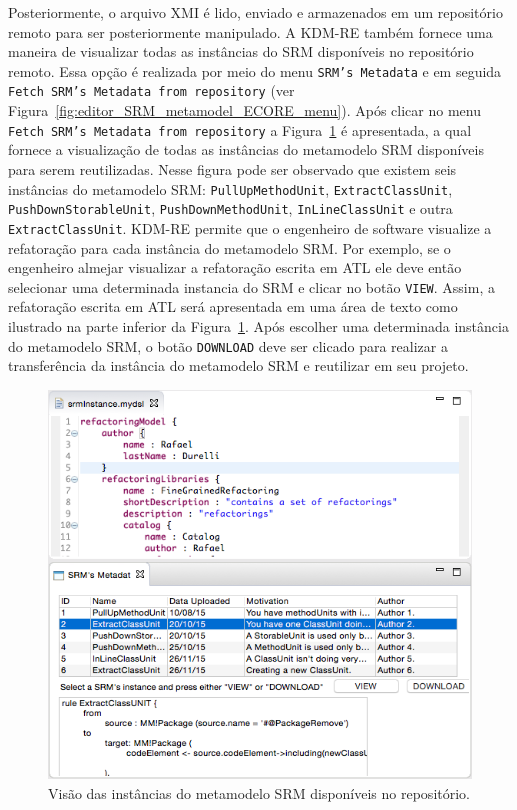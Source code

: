  Posteriormente, o arquivo XMI é lido, enviado e armazenados em um repositório remoto para ser posteriormente manipulado. A KDM-RE também fornece uma maneira de visualizar todas as instâncias do SRM disponíveis no repositório remoto. Essa opção é realizada por meio do menu \texttt{SRM's Metadata} e em seguida \texttt{Fetch SRM's Metadata from repository} (ver Figura~\ref{fig:editor_SRM_metamodel_ECORE_menu}). Após clicar no menu \texttt{Fetch SRM's Metadata from repository} a Figura~\ref{fig:download_kDM_re_repository} é apresentada, a qual fornece a visualização de todas as instâncias do metamodelo SRM disponíveis para serem reutilizadas. Nesse figura pode ser observado que existem seis instâncias do metamodelo SRM: \texttt{PullUpMethodUnit}, \texttt{ExtractClassUnit}, \texttt{PushDownStorableUnit}, \texttt{PushDownMethodUnit}, \texttt{InLineClassUnit} e outra \texttt{ExtractClassUnit}. KDM-RE permite que o engenheiro de software visualize a refatoração para cada instância do metamodelo SRM. Por exemplo, se o engenheiro almejar visualizar a refatoração escrita em ATL ele deve então selecionar uma determinada instancia do SRM e clicar no botão \texttt{VIEW}. Assim, a refatoração escrita em ATL será apresentada em uma área de texto como ilustrado na parte inferior da Figura~\ref{fig:download_kDM_re_repository}. Após escolher uma determinada instância do metamodelo SRM, o botão \texttt{DOWNLOAD} deve ser clicado para realizar a transferência da instância do metamodelo SRM e reutilizar em seu projeto. 

\begin{figure}[!h]
	\centering
	\caption{Visão das instâncias do metamodelo SRM disponíveis no repositório.}
	\label{fig:download_kDM_re_repository}
	\includegraphics[scale=0.6]{images/DOWNLOAD_KDM_RE}
	\fautor
\end{figure}


